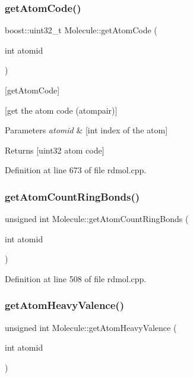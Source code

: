 \subsubsection{\texorpdfstring{get\+Atom\+Code()}{getAtomCode()}}
{\footnotesize\ttfamily boost\+::uint32\+\_\+t Molecule\+::get\+Atom\+Code (\begin{DoxyParamCaption}\item[{int}]{atomid }\end{DoxyParamCaption})}



\mbox{[}get\+Atom\+Code\mbox{]} 

\mbox{[}get the atom code (atompair)\mbox{]}


\begin{DoxyParams}{Parameters}
{\em atomid} & \mbox{[}int index of the atom\mbox{]} \\
\hline
\end{DoxyParams}
\begin{DoxyReturn}{Returns}
\mbox{[}uint32 atom code\mbox{]} 
\end{DoxyReturn}


Definition at line 673 of file rdmol.\+cpp.

\mbox{\label{class_molecule_a180abc69d36d7909f3ed578475cc075c}} 
\subsubsection{\texorpdfstring{get\+Atom\+Count\+Ring\+Bonds()}{getAtomCountRingBonds()}}
{\footnotesize\ttfamily unsigned int Molecule\+::get\+Atom\+Count\+Ring\+Bonds (\begin{DoxyParamCaption}\item[{int}]{atomid }\end{DoxyParamCaption})}



Definition at line 508 of file rdmol.\+cpp.

\mbox{\label{class_molecule_ab20d6bcc1513a5dbe3648eec782003df}} 
\subsubsection{\texorpdfstring{get\+Atom\+Heavy\+Valence()}{getAtomHeavyValence()}}
{\footnotesize\ttfamily unsigned int Molecule\+::get\+Atom\+Heavy\+Valence (\begin{DoxyParamCaption}\item[{int}]{atomid }\end{DoxyParamCaption})}



